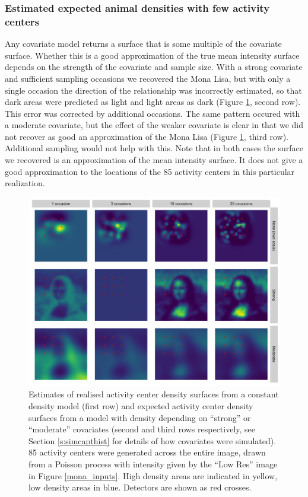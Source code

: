 \documentclass[a4paper,12pt]{article}
\begin{document}
\subsubsection{Estimated expected animal densities with few activity centers}

Any covariate model returns a surface that is some multiple of the covariate surface. Whether this is a good approximation of the true mean intensity surface depends on the strength of the covariate and sample size. With a strong covariate and sufficient sampling occasions we recovered the Mona Lisa, but with only a single occasion the direction of the relationship was incorrectly estimated, so that dark areas were predicted as light and light areas as dark (Figure \ref{peaky}, second row). This error was corrected by additional occasions. The same pattern occured with a moderate covariate, but the effect of the weaker covariate is clear in that we did not recover as good an approximation of the Mona Lisa (Figure \ref{peaky}, third row). Additional sampling would not help with this. Note that in both cases the surface we recovered is an approximation of the mean intensity surface. It does not give a good approximation to the locations of the 85 activity centers in this particular realization.

\begin{figure}[htbp]
\centering
\includegraphics[width=1\textwidth]{mona_peaky.png}
\caption{Estimates of realised activity center density surfaces from a constant density model (first row) and expected activity center density surfaces from a model with density depending on ``strong'' or ``moderate'' covariates (second and third rows respectively, see Section \ref{s:simcapthist} for details of how covariates were simulated). 85 activity centers were generated across the entire image, drawn from a Poisson process with intensity given by the ``Low Res'' image in Figure \ref{mona_inputs}. High density areas are indicated in yellow, low density areas in blue. Detectors are shown as red crosses.}
\label{peaky}
\end{figure}
\end{document}
